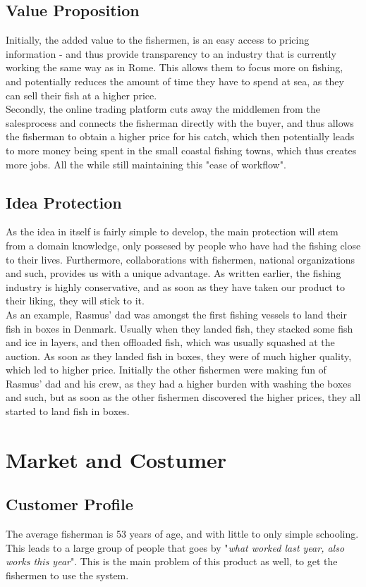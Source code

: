 \documentclass[12pt]{article}
\begin{document}
\subsection{Value Proposition}
Initially, the added value to the fishermen, is an easy access to pricing information - and thus provide transparency to an industry that is currently working the same way as in Rome. This allows them to focus more on fishing, and potentially reduces the amount of time they have to spend at sea, as they can sell their fish at a higher price.\\

Secondly, the online trading platform cuts away the middlemen from the salesprocess and connects the fisherman directly with the buyer, and thus allows the fisherman to obtain a higher price for his catch, which then potentially leads to more money being spent in the small coastal fishing towns, which thus creates more jobs. All the while still maintaining this "ease of workflow".

\subsection{Idea Protection}
As the idea in itself is fairly simple to develop, the main protection will stem from a domain knowledge, only possesed by people who have had the fishing close to their lives. Furthermore, collaborations with fishermen, national organizations and such, provides us with a unique advantage. As written earlier, the fishing industry is highly conservative, and as soon as they have taken our product to their liking, they will stick to it.\\

As an example, Rasmus' dad was amongst the first fishing vessels to land their fish in boxes in Denmark. Usually when they landed fish, they stacked some fish and ice in layers, and then offloaded fish, which was usually squashed at the auction. As soon as they landed fish in boxes, they were of much higher quality, which led to higher price. Initially the other fishermen were making fun of Rasmus' dad and his crew, as they had a higher burden with washing the boxes and such, but as soon as the other fishermen discovered the higher prices, they all started to land fish in boxes. 

\cleardoublepage
\section{Market and Costumer}
\subsection{Customer Profile}
The average fisherman is 53 years of age, and with little to only simple schooling. This leads to a large group of people that goes by "\textit{what worked last year, also works this year}". This is the main problem of this product as well, to get the fishermen to use the system.\\
\end{document}
